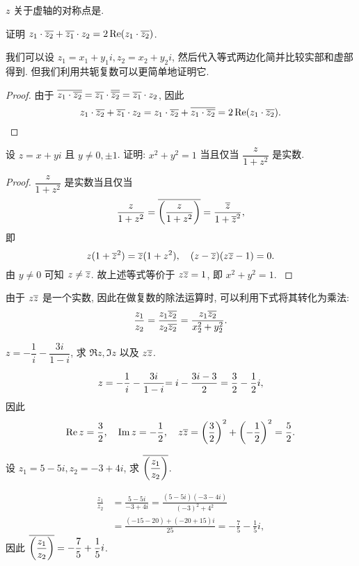 \documentclass[xcolor={table}]{ctexbook}
\begin{document}
\begin{exercise}
	$z$ 关于虚轴的对称点是.
\end{exercise}
\begin{example}
	证明 $z_1\cdot\overline{z_2}+\overline{z_1}\cdot z_2=2\operatorname{Re}(z_1\cdot\overline{z_2})$.
\end{example}
我们可以设 $z_1=x_1+y_1i,z_2=x_2+y_2i$, 然后代入等式两边化简并比较实部和虚部得到.
但我们利用共轭复数可以更简单地证明它.
\begin{proof}
	{%
		由于 $\overline{z_1\cdot\overline{z_2}}=\overline{z_1}\cdot\overline{\overline{z_2}}=\overline{z_1}\cdot z_2$, %
		因此
		\[z_1\cdot\overline{z_2}+\overline{z_1}\cdot z_2
			=z_1\cdot\overline{z_2}+\overline{z_1\cdot\overline{z_2}}
			=2\operatorname{Re}(z_1\cdot\overline{z_2}).\qedhere\]
	}
\end{proof}

\begin{example}
	设 $z=x+yi$ 且 $y\neq 0,\pm1$. 证明: $x^2+y^2=1$ 当且仅当 $\dfrac z{1+z^2}$ 是实数.
\end{example}
\begin{proof}
	$\dfrac z{1+z^2}$ 是实数当且仅当
	\[\frac z{1+z^2}=\overline{\left(\frac z{1+z^2}\right)}=\frac{\overline z}{1+{\overline z}^2},\]
	{%
		即
		\[z(1+{\overline z}^2)=\overline z(1+z^2),\quad (z-\overline z)(z\overline z-1)=0.\]%
		由 $y\neq0$ 可知 $z\neq \overline z$.%
		故上述等式等价于 $z\overline z=1$, 即 $x^2+y^2=1$.\qedhere
	}
\end{proof}

由于 $z\overline z$ 是一个实数,
因此在做复数的除法运算时, 可以利用下式将其转化为乘法:
	\[\dfrac{z_1}{z_2}=\dfrac{z_1\overline{z_2}}{z_2\overline{z_2}}=\dfrac{z_1\overline{z_2}}{x_2^2+y_2^2}.\]
\begin{example}
	$z=-\dfrac1i-\dfrac{3i}{1-i}$, 求 $\Re z,\Im z$ 以及 $z\overline z$.
\end{example}
\begin{solution}
	\[z=-\frac1i-\frac{3i}{1-i}
	{=i-\frac{3i-3}2=\frac32-\frac{1}{2} i,}\]
	{%
		因此
			\[\operatorname{Re} z=\frac32,\quad\operatorname{Im} z=-\frac{1}{2} ,\quad
			z\overline z=\left(\frac32\right)^2+\left(-\frac{1}{2}\right)^2=\frac52.\]
	}
\end{solution}

\begin{example}
	设 $z_1=5-5i,z_2=-3+4i$, 求 $\overline{\left(\dfrac{z_1}{z_2}\right)}$.
\end{example}
\begin{solution}
	\begin{align*}
		\frac{z_1}{z_2}&=\frac{5-5i}{-3+4i}
		{=\frac{(5-5i)(-3-4i)}{(-3)^2+4^2}}\\
		&{=\frac{(-15-20)+(-20+15)i}{25}}
		{=-\frac75-\frac15i,}
	\end{align*}
	{%
		因此 $\overline{\left(\dfrac{z_1}{z_2}\right)}=-\dfrac75+\dfrac15i$.
	}
\end{solution}
\end{document}
